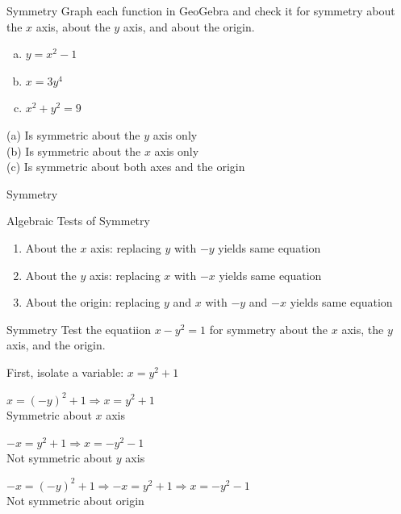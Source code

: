\documentclass{beamer}
\begin{document}
\begin{frame}[t]{Symmetry}
Graph each function in GeoGebra and check it for symmetry about the $x$ axis, about the $y$ axis, and about the origin. 
\begin{enumerate}[(a)]
\item $y = x^2 - 1$
\item $x = 3y^4$
\item $x^2 + y^2 = 9$
\end{enumerate}

\pause

(a) Is symmetric about the $y$ axis only \\
(b) Is symmetric about the $x$ axis only \\
(c) Is symmetric about both axes and the origin
\end{frame}

\begin{frame}[t]{Symmetry}
\begin{block}{Algebraic Tests of Symmetry}
\begin{enumerate}[1)]
\item About the $x$ axis: replacing $y$ with $-y$ yields same equation
\item About the $y$ axis: replacing $x$ with $-x$ yields same equation
\item About the origin: replacing $y$ and $x$ with $-y$ and $-x$ yields same equation
\end{enumerate}
\end{block}
\end{frame}

\begin{frame}[t]{Symmetry}
Test the equatiion $x - y^2 = 1$ for symmetry about the $x$ axis, the $y$ axis, and the origin.

First, isolate a variable: $x = y^2 + 1$ \vspace{10pt}

\pause

$x = (-y)^2 + 1 \Rightarrow x = y^2 + 1$ \\
Symmetric about $x$ axis \vspace{10pt}

\pause

$-x = y^2 + 1 \Rightarrow x = -y^2 - 1$ \\
Not symmetric about $y$ axis \vspace{10pt}

\pause

$-x = (-y)^2 + 1 \Rightarrow -x = y^2 + 1 \Rightarrow x = -y^2 - 1$ \\
Not symmetric about origin

\end{frame}
\end{document}

